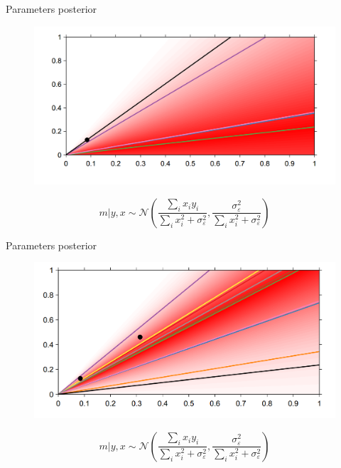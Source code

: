 \documentclass[12pt]{beamer}
\begin{document}
\begin{frame}{Parameters posterior}
\begin{figure}
\includegraphics[scale=0.4]{Bayesian_1.png} 
\end{figure}
$$m|y,x \sim \mathcal{N}\left(\frac{\sum_i x_i y_i}{\sum_i x_i^2 + \sigma_{\varepsilon}^2},\frac{\sigma_{\varepsilon}^2}{\sum_i x_i^2 + \sigma_{\varepsilon}^2}\right)$$
\end{frame}


\begin{frame}{Parameters posterior}
\begin{figure}
\includegraphics[scale=0.4]{Bayesian_2.png} 
\end{figure}
$$m|y,x \sim \mathcal{N}\left(\frac{\sum_i x_i y_i}{\sum_i x_i^2 + \sigma_{\varepsilon}^2},\frac{\sigma_{\varepsilon}^2}{\sum_i x_i^2 + \sigma_{\varepsilon}^2}\right)$$
\end{frame}
\end{document}
